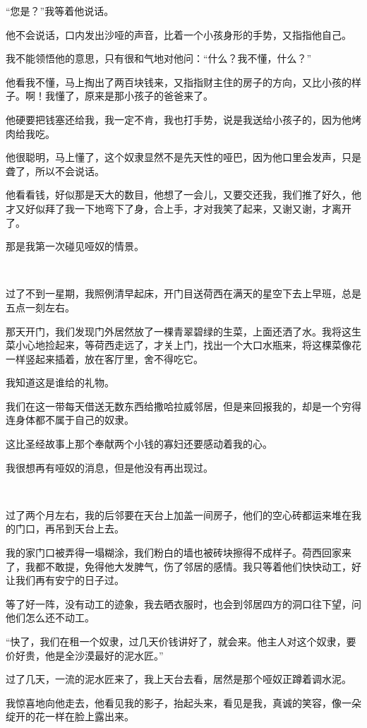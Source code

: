 \par “您是？”我等着他说话。
\par 他不会说话，口内发出沙哑的声音，比着一个小孩身形的手势，又指指他自己。
\par 我不能领悟他的意思，只有很和气地对他问：“什么？我不懂，什么？”
\par 他看我不懂，马上掏出了两百块钱来，又指指财主住的房子的方向，又比小孩的样子。啊！我懂了，原来是那小孩子的爸爸来了。
\par 他硬要把钱塞还给我，我一定不肯，我也打手势，说是我送给小孩子的，因为他烤肉给我吃。
\par 他很聪明，马上懂了，这个奴隶显然不是先天性的哑巴，因为他口里会发声，只是聋了，所以不会说话。
\par 他看看钱，好似那是天大的数目，他想了一会儿，又要交还我，我们推了好久，他才又好似拜了我一下地弯下了身，合上手，才对我笑了起来，又谢又谢，才离开了。
\par 那是我第一次碰见哑奴的情景。
\par  
\par 过了不到一星期，我照例清早起床，开门目送荷西在满天的星空下去上早班，总是五点一刻左右。
\par 那天开门，我们发现门外居然放了一棵青翠碧绿的生菜，上面还洒了水。我将这生菜小心地捡起来，等荷西走远了，才关上门，找出一个大口水瓶来，将这棵菜像花一样竖起来插着，放在客厅里，舍不得吃它。
\par 我知道这是谁给的礼物。
\par 我们在这一带每天借送无数东西给撒哈拉威邻居，但是来回报我的，却是一个穷得连身体都不属于自己的奴隶。
\par 这比圣经故事上那个奉献两个小钱的寡妇还要感动着我的心。
\par 我很想再有哑奴的消息，但是他没有再出现过。
\par  
\par 过了两个月左右，我的后邻要在天台上加盖一间房子，他们的空心砖都运来堆在我的门口，再吊到天台上去。
\par 我的家门口被弄得一塌糊涂，我们粉白的墙也被砖块擦得不成样子。荷西回家来了，我都不敢提，免得他大发脾气，伤了邻居的感情。我只等着他们快快动工，好让我们再有安宁的日子过。
\par 等了好一阵，没有动工的迹象，我去晒衣服时，也会到邻居四方的洞口往下望，问他们怎么还不动工。
\par “快了，我们在租一个奴隶，过几天价钱讲好了，就会来。他主人对这个奴隶，要价好贵，他是全沙漠最好的泥水匠。”
\par 过了几天，一流的泥水匠来了，我上天台去看，居然是那个哑奴正蹲着调水泥。
\par 我惊喜地向他走去，他看见我的影子，抬起头来，看见是我，真诚的笑容，像一朵绽开的花一样在脸上露出来。
